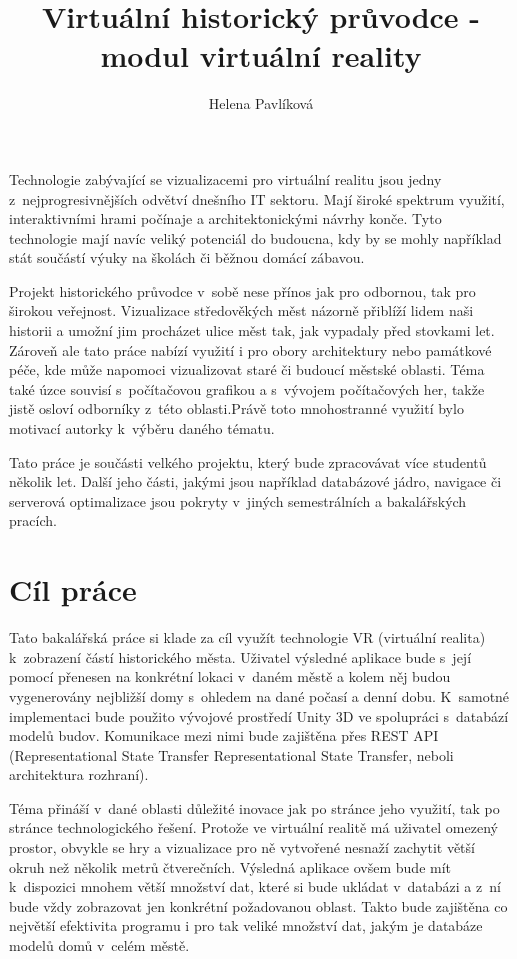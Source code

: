 \documentclass[thesis=B,czech]{FITthesis}[2012/06/26]
\title{Virtuální historický průvodce - modul virtuální reality}
\author{Helena Pavlíková} %
\begin{document}
\begin{introduction}
	Technologie zabývající se vizualizacemi pro virtuální realitu jsou jedny z~nejprogresivnějších odvětví dnešního IT sektoru. Mají široké spektrum využití, interaktivními hrami počínaje a architektonickými návrhy konče. Tyto technologie mají navíc veliký potenciál do budoucna, kdy by se mohly například stát součástí výuky na školách či běžnou domácí zábavou.

    Projekt historického průvodce v~sobě nese přínos jak pro odbornou, tak pro širokou veřejnost. Vizualizace středověkých měst názorně přiblíží lidem naši historii a umožní jim procházet ulice měst tak, jak vypadaly před stovkami let. Zároveň ale tato práce nabízí využití i pro obory architektury nebo památkové péče, kde může napomoci vizualizovat staré či budoucí městské oblasti. Téma také úzce souvisí s~počítačovou grafikou a s~vývojem počítačových her, takže jistě osloví odborníky z~této oblasti.Právě toto mnohostranné využití bylo motivací autorky k~výběru daného tématu.

    Tato práce je součásti velkého projektu, který bude zpracovávat více studentů několik let. Další jeho části, jakými jsou například databázové jádro, navigace či serverová optimalizace jsou pokryty v~jiných semestrálních a bakalářských pracích.

\end{introduction}

\chapter{Cíl práce}

Tato bakalářská práce si klade za cíl využít technologie VR (virtuální realita) k~zobrazení částí historického města. Uživatel výsledné aplikace bude s~její pomocí přenesen na konkrétní lokaci v~daném městě a kolem něj budou vygenerovány nejbližší domy s~ohledem na dané počasí a denní dobu.  K~samotné implementaci bude použito vývojové prostředí Unity 3D ve spolupráci s~databází modelů budov. Komunikace mezi nimi bude zajištěna přes REST API (Representational State Transfer Representational State Transfer, neboli architektura rozhraní).
    
	Téma přináší v~dané oblasti důležité inovace jak po stránce jeho využití, tak po stránce technologického řešení. Protože ve virtuální realitě má uživatel omezený prostor, obvykle se hry a vizualizace pro ně vytvořené nesnaží zachytit větší okruh než několik metrů čtverečních. Výsledná aplikace ovšem bude mít k~dispozici mnohem větší množství dat, které si bude ukládat v~databázi a z~ní bude vždy zobrazovat jen konkrétní požadovanou oblast. Takto bude zajištěna co největší efektivita programu i pro tak veliké množství dat, jakým je databáze modelů domů v~celém městě.
	
\end{document}
